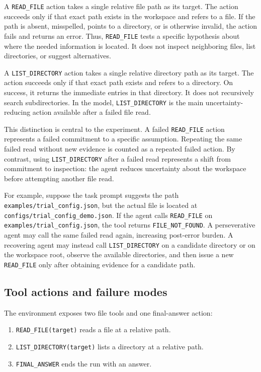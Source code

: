 \documentclass[11pt]{article}
\begin{document}
A \texttt{READ\_FILE} action takes a single relative file path as its target. The action succeeds only if that exact path exists in the workspace and refers to a file. If the path is absent, misspelled, points to a directory, or is otherwise invalid, the action fails and returns an error. Thus, \texttt{READ\_FILE} tests a specific hypothesis about where the needed information is located. It does not inspect neighboring files, list directories, or suggest alternatives.

A \texttt{LIST\_DIRECTORY} action takes a single relative directory path as its target. The action succeeds only if that exact path exists and refers to a directory. On success, it returns the immediate entries in that directory. It does not recursively search subdirectories. In the model, \texttt{LIST\_DIRECTORY} is the main uncertainty-reducing action available after a failed file read.

This distinction is central to the experiment. A failed \texttt{READ\_FILE} action represents a failed commitment to a specific assumption. Repeating the same failed read without new evidence is counted as a repeated failed action. By contrast, using \texttt{LIST\_DIRECTORY} after a failed read represents a shift from commitment to inspection: the agent reduces uncertainty about the workspace before attempting another file read.

For example, suppose the task prompt suggests the path \texttt{examples/trial\_config.json}, but the actual file is located at \texttt{configs/trial\_config\_demo.json}. If the agent calls \texttt{READ\_FILE} on \texttt{examples/trial\_config.json}, the tool returns \texttt{FILE\_NOT\_FOUND}. A perseverative agent may call the same failed read again, increasing post-error burden. A recovering agent may instead call \texttt{LIST\_DIRECTORY} on a candidate directory or on the workspace root, observe the available directories, and then issue a new \texttt{READ\_FILE} only after obtaining evidence for a candidate path.

\subsection{Tool actions and failure modes}

The environment exposes two file tools and one final-answer action:

\begin{enumerate}[leftmargin=1.5em]
    \item \texttt{READ\_FILE(target)} reads a file at a relative path.
    \item \texttt{LIST\_DIRECTORY(target)} lists a directory at a relative path.
    \item \texttt{FINAL\_ANSWER} ends the run with an answer.
\end{enumerate}
\end{document}
